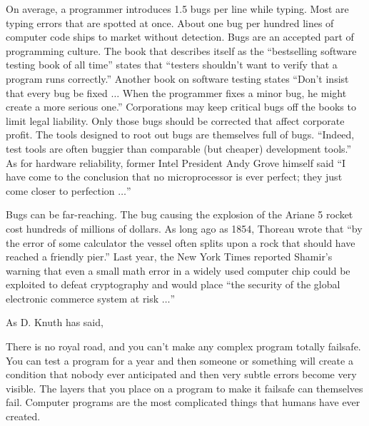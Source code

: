\documentclass{llncs}
\begin{document}
  On average,
a programmer introduces 1.5 bugs per line while typing.
Most are typing errors that are spotted at once.
About one bug per hundred lines of computer code ships  to
market without detection.  Bugs are an accepted
part of programming culture.
The book that describes itself as the ``bestselling software testing
book of all time'' states that ``testers shouldn't want to verify
that a program runs correctly.'' 
Another book on software
testing states ``Don't insist that every bug be fixed $\ldots$
When the programmer fixes a minor bug, he might create
a more serious one.''  Corporations may keep critical bugs
off the books to
limit legal liability.
 Only those bugs should be corrected
that affect corporate profit.
The tools designed to root out bugs are themselves
full of bugs. ``Indeed, test tools are often buggier than
comparable (but cheaper) development tools.''
As for hardware reliability, former 
Intel President Andy Grove himself said 
``I have come to the conclusion that no microprocessor is ever
perfect; they just come closer to perfection $\ldots$''


Bugs can be far-reaching.
The bug causing the 
explosion of the Ariane 5 rocket cost hundreds of millions
of dollars.  As long ago as 1854, Thoreau wrote that 
``by the error of some calculator
the vessel often splits upon a rock that should have reached
a friendly pier.''  %
Last year, the New York Times reported Shamir's warning that
even a small math error in a widely used computer chip could 
be exploited to defeat cryptography and would
place
``the security of the global electronic commerce system at risk
$\ldots$''

As D. Knuth has said, 
{

\narrower\it

There is no royal road, and you can't make any complex program totally failsafe. You can test a program for a year and then someone or something will create a condition that nobody ever anticipated and then very subtle errors become very visible. The layers that you place on a program to make it failsafe can themselves fail. Computer programs are the most complicated things that humans have ever created. 

}
\end{document}
